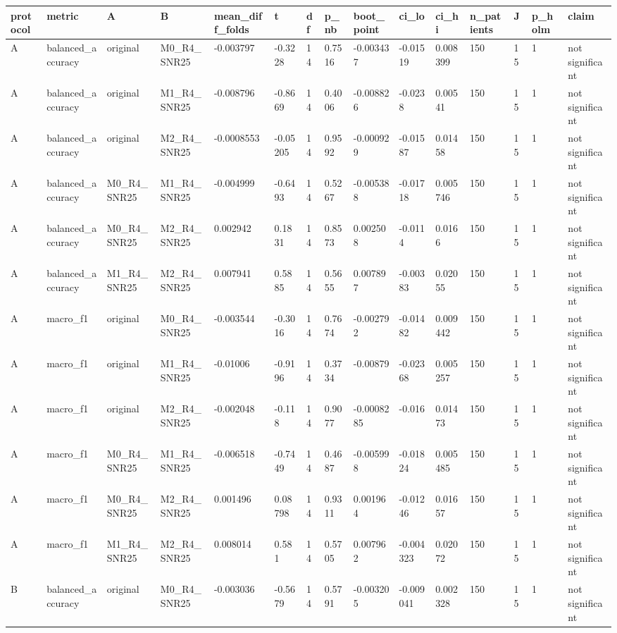 \begin{tabular}{lllllllllllllll}
\hline
protocol & metric & A & B & mean\_diff\_folds & t & df & p\_nb & boot\_point & ci\_lo & ci\_hi & n\_patients & J & p\_holm & claim \\
\hline
A & balanced\_accuracy & original & M0\_R4\_SNR25 & -0.003797 & -0.3228 & 14 & 0.7516 & -0.003437 & -0.01519 & 0.008399 & 150 & 15 & 1 & not significant \\
A & balanced\_accuracy & original & M1\_R4\_SNR25 & -0.008796 & -0.8669 & 14 & 0.4006 & -0.008826 & -0.0238 & 0.00541 & 150 & 15 & 1 & not significant \\
A & balanced\_accuracy & original & M2\_R4\_SNR25 & -0.0008553 & -0.05205 & 14 & 0.9592 & -0.000929 & -0.01587 & 0.01458 & 150 & 15 & 1 & not significant \\
A & balanced\_accuracy & M0\_R4\_SNR25 & M1\_R4\_SNR25 & -0.004999 & -0.6493 & 14 & 0.5267 & -0.005388 & -0.01718 & 0.005746 & 150 & 15 & 1 & not significant \\
A & balanced\_accuracy & M0\_R4\_SNR25 & M2\_R4\_SNR25 & 0.002942 & 0.1831 & 14 & 0.8573 & 0.002508 & -0.0114 & 0.0166 & 150 & 15 & 1 & not significant \\
A & balanced\_accuracy & M1\_R4\_SNR25 & M2\_R4\_SNR25 & 0.007941 & 0.5885 & 14 & 0.5655 & 0.007897 & -0.00383 & 0.02055 & 150 & 15 & 1 & not significant \\
A & macro\_f1 & original & M0\_R4\_SNR25 & -0.003544 & -0.3016 & 14 & 0.7674 & -0.002792 & -0.01482 & 0.009442 & 150 & 15 & 1 & not significant \\
A & macro\_f1 & original & M1\_R4\_SNR25 & -0.01006 & -0.9196 & 14 & 0.3734 & -0.00879 & -0.02368 & 0.005257 & 150 & 15 & 1 & not significant \\
A & macro\_f1 & original & M2\_R4\_SNR25 & -0.002048 & -0.118 & 14 & 0.9077 & -0.0008285 & -0.016 & 0.01473 & 150 & 15 & 1 & not significant \\
A & macro\_f1 & M0\_R4\_SNR25 & M1\_R4\_SNR25 & -0.006518 & -0.7449 & 14 & 0.4687 & -0.005998 & -0.01824 & 0.005485 & 150 & 15 & 1 & not significant \\
A & macro\_f1 & M0\_R4\_SNR25 & M2\_R4\_SNR25 & 0.001496 & 0.08798 & 14 & 0.9311 & 0.001964 & -0.01246 & 0.01657 & 150 & 15 & 1 & not significant \\
A & macro\_f1 & M1\_R4\_SNR25 & M2\_R4\_SNR25 & 0.008014 & 0.581 & 14 & 0.5705 & 0.007962 & -0.004323 & 0.02072 & 150 & 15 & 1 & not significant \\
B & balanced\_accuracy & original & M0\_R4\_SNR25 & -0.003036 & -0.5679 & 14 & 0.5791 & -0.003205 & -0.009041 & 0.002328 & 150 & 15 & 1 & not significant \\

\end{tabular}
